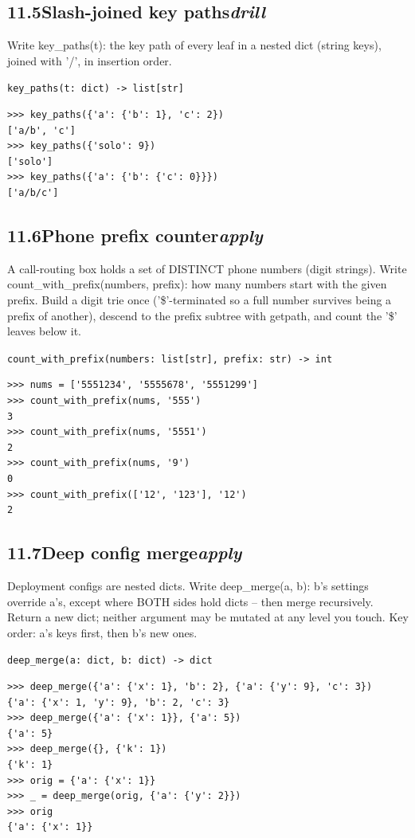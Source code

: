 \documentclass[10pt,letterpaper]{book}
\begin{document}
\subsection*{11.5\quad Slash-joined key paths\hfill\textnormal{\textit{drill}}}
Write key\_paths(t): the key path of every leaf in a nested dict (string keys), joined with '/', in insertion order.

\noindent\texttt{key\_paths(t: dict) -> list[str]}
\begin{lstlisting}[style=ex]
>>> key_paths({'a': {'b': 1}, 'c': 2})
['a/b', 'c']
>>> key_paths({'solo': 9})
['solo']
>>> key_paths({'a': {'b': {'c': 0}}})
['a/b/c']
\end{lstlisting}
\subsection*{11.6\quad Phone prefix counter\hfill\textnormal{\textit{apply}}}
A call-routing box holds a set of DISTINCT phone numbers (digit strings). Write count\_with\_prefix(numbers, prefix): how many numbers start with the given prefix. Build a digit trie once ('\$'-terminated so a full number survives being a prefix of another), descend to the prefix subtree with getpath, and count the '\$' leaves below it.

\noindent\texttt{count\_with\_prefix(numbers: list[str], prefix: str) -> int}
\begin{lstlisting}[style=ex]
>>> nums = ['5551234', '5555678', '5551299']
>>> count_with_prefix(nums, '555')
3
>>> count_with_prefix(nums, '5551')
2
>>> count_with_prefix(nums, '9')
0
>>> count_with_prefix(['12', '123'], '12')
2
\end{lstlisting}
\subsection*{11.7\quad Deep config merge\hfill\textnormal{\textit{apply}}}
Deployment configs are nested dicts. Write deep\_merge(a, b): b's settings override a's, except where BOTH sides hold dicts -- then merge recursively. Return a new dict; neither argument may be mutated at any level you touch. Key order: a's keys first, then b's new ones.

\noindent\texttt{deep\_merge(a: dict, b: dict) -> dict}
\begin{lstlisting}[style=ex]
>>> deep_merge({'a': {'x': 1}, 'b': 2}, {'a': {'y': 9}, 'c': 3})
{'a': {'x': 1, 'y': 9}, 'b': 2, 'c': 3}
>>> deep_merge({'a': {'x': 1}}, {'a': 5})
{'a': 5}
>>> deep_merge({}, {'k': 1})
{'k': 1}
>>> orig = {'a': {'x': 1}}
>>> _ = deep_merge(orig, {'a': {'y': 2}})
>>> orig
{'a': {'x': 1}}
\end{lstlisting}
\end{document}
